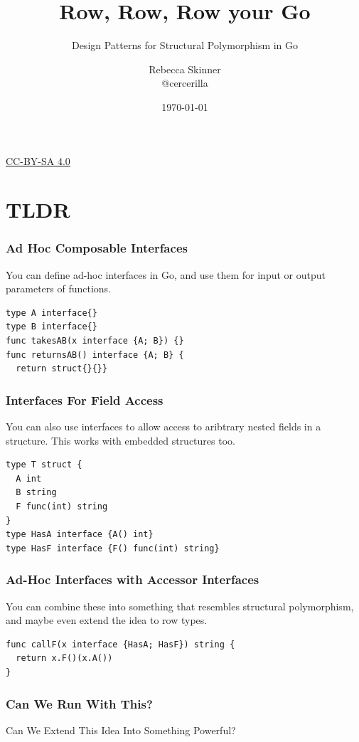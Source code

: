 \documentclass{beamer}
\title{Row, Row, Row your Go}
\subtitle{Design Patterns for Structural Polymorphism in Go}
\author{Rebecca Skinner\\ \small{@cercerilla}}
\date{\today}
\newcommand{\hugecenter}[1]{\begin{center}\begin{huge}#1\end{huge}\end{center}}
\newcommand{\chref}[3] {
  {\color{#1} \href{#2}{\underline{#3}}}
}
\begin{document}
\begin{frame}
  \titlepage{}
\end{frame}
\begin{frame}
  \begin{center}
    \small{\chref{blue}{http://creativecommons.org/licenses/by-sa/4.0/}{CC-BY-SA 4.0}}
  \end{center}
\end{frame}

\section{TLDR}
\begin{frame}[fragile]
  \frametitle{Ad Hoc Composable Interfaces}
  You can define ad-hoc interfaces in Go, and use them for input or
  output parameters of functions.
  \pause
\begin{lstlisting}[language=Golang]
type A interface{}
type B interface{}
func takesAB(x interface {A; B}) {}
func returnsAB() interface {A; B} {
  return struct{}{}}
\end{lstlisting}
\end{frame}

\begin{frame}[fragile]
  \frametitle{Interfaces For Field Access}
  You can also use interfaces to allow access to aribtrary nested
  fields in a structure.  This works with embedded structures too.
  \pause
\begin{lstlisting}[language=Golang]
type T struct {
  A int
  B string
  F func(int) string
}
type HasA interface {A() int}
type HasF interface {F() func(int) string}
\end{lstlisting}
\end{frame}

\begin{frame}[fragile]
  \frametitle{Ad-Hoc Interfaces with Accessor Interfaces}
  You can combine these into something that resembles structural
  polymorphism, and maybe even extend the idea to row types.
  \pause
\begin{lstlisting}[language=Golang]
 func callF(x interface {HasA; HasF}) string {
  return x.F()(x.A())
}
\end{lstlisting}
\end{frame}

\begin{frame}
  \frametitle{Can We Run With This?}
  \hugecenter{Can We Extend This Idea Into Something Powerful?}
\end{frame}
\end{document}
